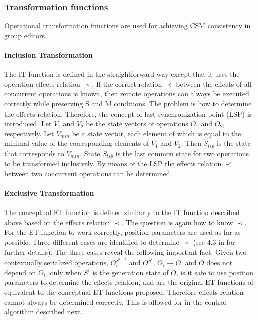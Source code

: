 \subsubsection{Transformation functions}
Operational transformation functions are used for achieving CSM consistency in group editors.

\paragraph{Inclusion Transformation}
The IT function is defined in the straightforward way except that it uses the operation effects relation $\prec$. If the correct relation $\prec$ between the effects of all concurrent operations is known, then remote operations can always be executed correctly while preserving S and M conditions. The problem is how to determine the effects relation. Therefore, the concept of last synchronization point (LSP) is introduced. Let $V_{1}$ and $V_{2}$ be the state vectors of operations $O_{1}$ and $O_{2}$, respectively. Let $V_{min}$ be a state vector, each element of which is equal to the minimal value of the corresponding elements of $V_{1}$ and $V_{2}$. Then $S_{lsp}$ is the state that corresponds to $V_{min}$. State $S_{lsp}$ is the last common state for two operations to be transformed inclusively. By means of the LSP the effects relation $\prec$ between two concurrent operations can be determined.

\paragraph{Exclusive Transformation}
The conceptual ET function is defined similarly to the IT function described above based on the effects relation $\prec$. The question is again how to know $\prec$. For the ET function to work correctly, position parameters are used as far as possible. Three different cases are identified to determine $\prec$ (see 4.3 in \cite{li04} for further details). The three cases reveal the following important fact: Given two contextually serialized operations, $O_i^{S^{i-1}}$ and $O^{S^i}$, $O_i \rightarrow O$, and $O$ does not depend on $O_i$, only when $S^i$ is the generation state of $O$, is it safe to use position parameters to determine the effects relation, and are the original ET functions of \cite{sun98a} equivalent to the conceptual ET functions proposed. Therefore effects relation cannot always be determined correctly. This is allowed for in the control algorithm described next.

